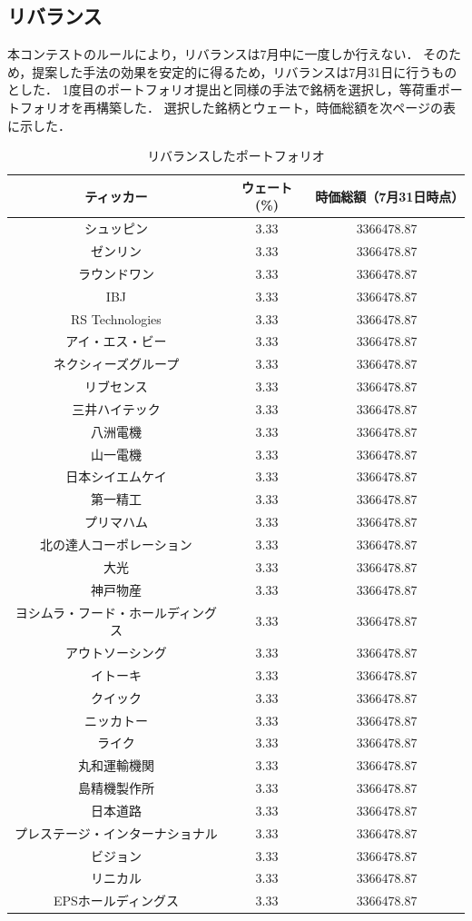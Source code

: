 ﻿\documentclass[a4paper]{jarticle}
\begin{document}
\subsection{リバランス}
本コンテストのルールにより，リバランスは7月中に一度しか行えない．
そのため，提案した手法の効果を安定的に得るため，リバランスは7月31日に行うものとした．
1度目のポートフォリオ提出と同様の手法で銘柄を選択し，等荷重ポートフォリオを再構築した．
選択した銘柄とウェート，時価総額を次ページの表に示した．
\begin{table}[htbp]
\caption{リバランスしたポートフォリオ}
\begin{center}
\begin{tabular}{|c|c|c|}
\hline
ティッカー & ウェート(\%) & 時価総額（7月31日時点）\\
\hline
\hline
シュッピン & 3.33 & 3366478.87\\
ゼンリン & 3.33 & 3366478.87\\
ラウンドワン & 3.33 & 3366478.87\\
IBJ & 3.33 & 3366478.87\\
RS Technologies & 3.33 & 3366478.87\\
アイ・エス・ビー & 3.33 & 3366478.87\\
ネクシィーズグループ & 3.33 & 3366478.87\\
リブセンス & 3.33 & 3366478.87\\
三井ハイテック & 3.33 & 3366478.87\\
八洲電機 & 3.33 & 3366478.87\\
山一電機 & 3.33 & 3366478.87\\
日本シイエムケイ & 3.33 & 3366478.87\\
第一精工 & 3.33 & 3366478.87\\
プリマハム & 3.33 & 3366478.87\\
北の達人コーポレーション & 3.33 & 3366478.87\\
大光 & 3.33 & 3366478.87\\
神戸物産 & 3.33 & 3366478.87\\
ヨシムラ・フード・ホールディングス & 3.33 & 3366478.87\\
アウトソーシング & 3.33 & 3366478.87\\
イトーキ & 3.33 & 3366478.87\\
クイック & 3.33 & 3366478.87\\
ニッカトー & 3.33 & 3366478.87\\
ライク & 3.33 & 3366478.87\\
丸和運輸機関 & 3.33 & 3366478.87\\
島精機製作所 & 3.33 & 3366478.87\\
日本道路 & 3.33 & 3366478.87\\
プレステージ・インターナショナル& 3.33 & 3366478.87\\
ビジョン & 3.33 & 3366478.87\\
リニカル & 3.33 & 3366478.87\\
EPSホールディングス & 3.33 & 3366478.87\\


\end{tabular}
\end{center}
\end{table}
\end{document}
